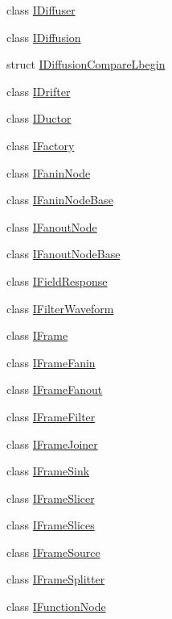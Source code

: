\begin{DoxyCompactItemize}
class \hyperlink{class_wire_cell_1_1_i_diffuser}{I\+Diffuser}
\item 
class \hyperlink{class_wire_cell_1_1_i_diffusion}{I\+Diffusion}
\item 
struct \hyperlink{struct_wire_cell_1_1_i_diffusion_compare_lbegin}{I\+Diffusion\+Compare\+Lbegin}
\item 
class \hyperlink{class_wire_cell_1_1_i_drifter}{I\+Drifter}
\item 
class \hyperlink{class_wire_cell_1_1_i_ductor}{I\+Ductor}
\item 
class \hyperlink{class_wire_cell_1_1_i_factory}{I\+Factory}
\item 
class \hyperlink{class_wire_cell_1_1_i_fanin_node}{I\+Fanin\+Node}
\item 
class \hyperlink{class_wire_cell_1_1_i_fanin_node_base}{I\+Fanin\+Node\+Base}
\item 
class \hyperlink{class_wire_cell_1_1_i_fanout_node}{I\+Fanout\+Node}
\item 
class \hyperlink{class_wire_cell_1_1_i_fanout_node_base}{I\+Fanout\+Node\+Base}
\item 
class \hyperlink{class_wire_cell_1_1_i_field_response}{I\+Field\+Response}
\item 
class \hyperlink{class_wire_cell_1_1_i_filter_waveform}{I\+Filter\+Waveform}
\item 
class \hyperlink{class_wire_cell_1_1_i_frame}{I\+Frame}
\item 
class \hyperlink{class_wire_cell_1_1_i_frame_fanin}{I\+Frame\+Fanin}
\item 
class \hyperlink{class_wire_cell_1_1_i_frame_fanout}{I\+Frame\+Fanout}
\item 
class \hyperlink{class_wire_cell_1_1_i_frame_filter}{I\+Frame\+Filter}
\item 
class \hyperlink{class_wire_cell_1_1_i_frame_joiner}{I\+Frame\+Joiner}
\item 
class \hyperlink{class_wire_cell_1_1_i_frame_sink}{I\+Frame\+Sink}
\item 
class \hyperlink{class_wire_cell_1_1_i_frame_slicer}{I\+Frame\+Slicer}
\item 
class \hyperlink{class_wire_cell_1_1_i_frame_slices}{I\+Frame\+Slices}
\item 
class \hyperlink{class_wire_cell_1_1_i_frame_source}{I\+Frame\+Source}
\item 
class \hyperlink{class_wire_cell_1_1_i_frame_splitter}{I\+Frame\+Splitter}
\item 
class \hyperlink{class_wire_cell_1_1_i_function_node}{I\+Function\+Node}

\end{DoxyCompactItemize}
